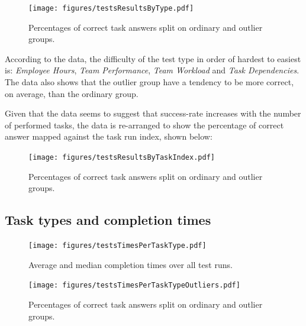 \documentclass[nofilelist,dvipsnames]{cslthse-msc}
\begin{document}
				\begin{figure}[ht!]
					\centering
          \texttt{[image: figures/testsResultsByType.pdf]}
          \caption{
            Percentages of correct task answers split on ordinary and outlier
            groups.
          }
				\end{figure}

        According to the data, the difficulty of the test type in order of
        hardest to easiest is: \textit{Employee Hours}, \textit{Team
          Performance}, \textit{Team Workload} and \textit{Task Dependencies}.
        The data also shows that the outlier group have a tendency to be more
        correct, on average, than the ordinary group.

        Given that the data seems to suggest that success-rate increases with
        the number of performed tasks, the data is re-arranged to show the
        percentage of correct answer mapped against the task run index, shown
        below:

				\begin{figure}[ht!]
					\centering
          \texttt{[image: figures/testsResultsByTaskIndex.pdf]}
          \caption{
            Percentages of correct task answers split on ordinary and outlier
            groups.
          }
				\end{figure}

%

      \newpage
      \subsection{Task types and completion times}

				\begin{figure}[h!]
					\centering
          \texttt{[image: figures/testsTimesPerTaskType.pdf]}
          \caption{
            Average and median completion times over all test runs.
          }
				\end{figure}

        \begin{figure}[h!]
          \centering
          \texttt{[image: figures/testsTimesPerTaskTypeOutliers.pdf]}
          \caption{
            Percentages of correct task answers split on ordinary and outlier
            groups.
          }
          \label{label_testsTimesPerTaskTypeOutliers}
        \end{figure}
\end{document}
